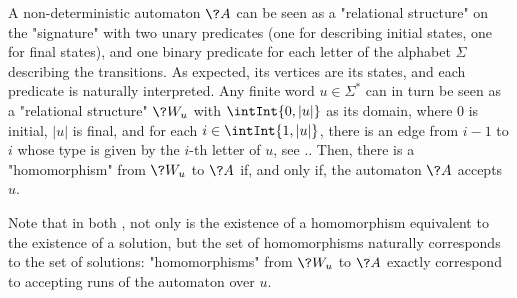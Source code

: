 \begin{example}
	\AP\label{ex:auto-as-rel}
	A non-deterministic automaton $\?A$ can be seen as a "relational structure"
	on the "signature" with two unary predicates (one for
	describing initial states, one for final states), and one binary predicate
	for each letter of the alphabet $\Sigma$ describing the transitions.
	As expected, its vertices are its states, 
	and each predicate is naturally interpreted.
	Any finite word $u\in \Sigma^*$ can in turn be seen as a "relational structure"
	$\?W_u$ with $\intInt{0,|u|}$ as its domain,
	where $0$ is initial, $|u|$ is final, and
	for each $i \in \intInt{1,|u|}$, there is an edge from $i-1$ to $i$
	whose type is given by the $i$-th letter of $u$, see ..
	Then, there is a "homomorphism" from $\?W_u$ to $\?A$ if, and only if, 
	the automaton $\?A$ accepts $u$.
\end{example}

Note that in both ,
not only is the existence of a homomorphism equivalent to the existence of a solution, but the set 
of homomorphisms naturally corresponds to the set of solutions: "homomorphisms" from $\?W_u$
to $\?A$ exactly correspond to accepting runs of the automaton over $u$.


